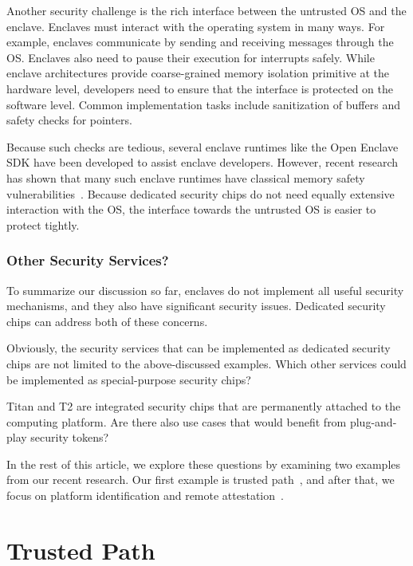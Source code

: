 \documentclass[letterpaper,twocolumn,10pt]{article}
\begin{document}
Another security challenge is the rich interface between the untrusted OS and the enclave. Enclaves must interact with the operating system in many ways. For example, enclaves communicate by sending and receiving messages through the OS. Enclaves also need to pause their execution for interrupts safely. While enclave architectures provide coarse-grained memory isolation primitive at the hardware level, developers need to ensure that the interface is protected on the software level. Common implementation tasks include sanitization of buffers and safety checks for pointers. 

Because such checks are tedious, several enclave runtimes like the Open Enclave SDK have been developed to assist enclave developers. However, recent research has shown that many such enclave runtimes have classical memory safety vulnerabilities~\cite{van2019tale}. Because dedicated security chips do not need equally extensive interaction with the OS, the interface towards the untrusted OS is easier to protect tightly. 


\subsubsection*{Other Security Services?}

To summarize our discussion so far, enclaves do not implement all useful security mechanisms, and they also have significant security issues. Dedicated security chips can address both of these concerns. 

Obviously, the security services that can be implemented as dedicated security chips are not limited to the above-discussed examples. Which other services could be implemented as special-purpose security chips? 

Titan and T2 are integrated security chips that are permanently attached to the computing platform. Are there also use cases that would benefit from plug-and-play security tokens?

In the rest of this article, we explore these questions by examining two examples from our recent research. Our first example is trusted path~\cite{protection}, and after that, we focus on platform identification and remote attestation~\cite{proximitee}. 



\section*{Trusted Path}
\end{document}
